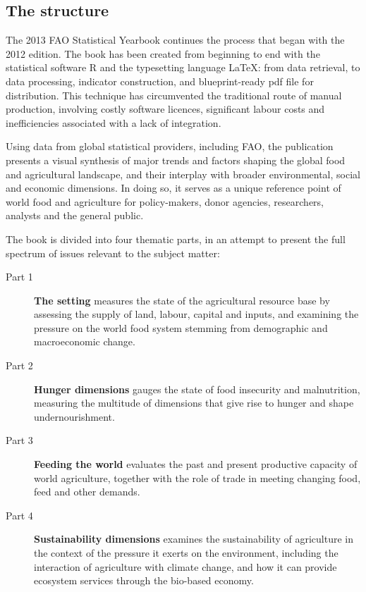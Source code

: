 
\subsection{The structure}

The 2013 FAO Statistical Yearbook continues the process that began with the 2012 edition. The book has been created from beginning to end with the statistical software R and the typesetting language \LaTeX: from data retrieval, to data processing, indicator construction, and blueprint-ready pdf file for distribution. This technique has circumvented the traditional route of manual production, involving costly software licences, significant labour costs and inefficiencies associated with a lack of integration.  

Using data from global statistical providers, including FAO, the publication presents a visual synthesis of  major trends and factors shaping the global food and agricultural landscape, and their interplay with broader environmental, social and economic dimensions. In doing so, it serves as a unique reference point of world food and agriculture for policy-makers, donor agencies, researchers,  analysts and the general public.

The book is divided into four thematic parts, in an attempt to present the full spectrum of issues relevant to the subject matter:

\begin{description}
\item[Part 1] {\textbf{\color{part1}The setting}} measures the state of the agricultural resource base by assessing the supply of land, labour, capital and inputs, and examining the pressure on the world food system stemming from demographic and macroeconomic change.
\item[Part 2] {\textbf{\color{part2}Hunger dimensions}} gauges the state of food insecurity and malnutrition, measuring the multitude of dimensions that give rise to hunger and shape undernourishment.
\item[Part 3] {\textbf{\color{part3}Feeding the world}} evaluates the past and present productive capacity of world agriculture, together with the role of trade in meeting changing food, feed and other demands.
\item[Part 4] {\textbf{\color{part4}Sustainability dimensions}} examines the sustainability of agriculture in the context of the pressure it exerts on the environment, including the interaction of agriculture with climate change,  and how it can provide ecosystem services through the bio-based economy.
\end{description}

